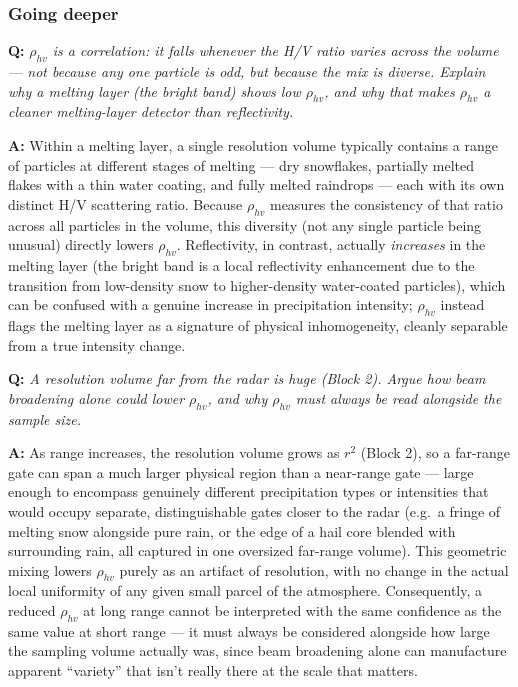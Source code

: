 \documentclass[11pt]{article}
\newenvironment{qa}[1]{\par\noindent\textbf{\color{qgray}Q: }\emph{#1}\par\noindent\textbf{A: }}{\par\vspace{6pt}}
\newcommand{\tier}[1]{\subsubsection*{#1}}
\begin{document}
\tier{Going deeper}
\begin{qa}{$\rho_{hv}$ is a correlation: it falls whenever the H/V ratio \emph{varies} across the volume --- not because any one particle is odd, but because the mix is diverse. Explain why a melting layer (the bright band) shows low $\rho_{hv}$, and why that makes $\rho_{hv}$ a cleaner melting-layer detector than reflectivity.}
Within a melting layer, a single resolution volume typically contains a range of particles at different stages of melting --- dry snowflakes, partially melted flakes with a thin water coating, and fully melted raindrops --- each with its own distinct H/V scattering ratio. Because $\rho_{hv}$ measures the consistency of that ratio across all particles in the volume, this diversity (not any single particle being unusual) directly lowers $\rho_{hv}$. Reflectivity, in contrast, actually \emph{increases} in the melting layer (the bright band is a local reflectivity enhancement due to the transition from low-density snow to higher-density water-coated particles), which can be confused with a genuine increase in precipitation intensity; $\rho_{hv}$ instead flags the melting layer as a signature of physical inhomogeneity, cleanly separable from a true intensity change.
\end{qa}
\begin{qa}{A resolution volume far from the radar is huge (Block 2). Argue how beam broadening alone could lower $\rho_{hv}$, and why $\rho_{hv}$ must always be read alongside the sample size.}
As range increases, the resolution volume grows as $r^2$ (Block 2), so a far-range gate can span a much larger physical region than a near-range gate --- large enough to encompass genuinely different precipitation types or intensities that would occupy separate, distinguishable gates closer to the radar (e.g.\ a fringe of melting snow alongside pure rain, or the edge of a hail core blended with surrounding rain, all captured in one oversized far-range volume). This geometric mixing lowers $\rho_{hv}$ purely as an artifact of resolution, with no change in the actual local uniformity of any given small parcel of the atmosphere. Consequently, a reduced $\rho_{hv}$ at long range cannot be interpreted with the same confidence as the same value at short range --- it must always be considered alongside how large the sampling volume actually was, since beam broadening alone can manufacture apparent ``variety'' that isn't really there at the scale that matters.
\end{qa}
\end{document}
